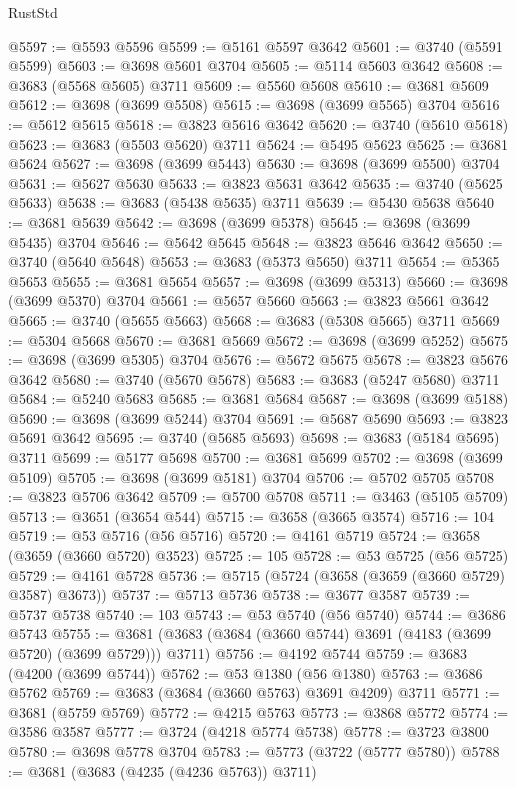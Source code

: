 \begin{lexlean}{RustStd}
\begin{coremodule}
@5597 := @5593 @5596
@5599 := @5161 @5597 @3642
@5601 := @3740 (@5591 @5599)
@5603 := @3698 @5601 @3704
@5605 := @5114 @5603 @3642
@5608 := @3683 (@5568 @5605) @3711
@5609 := @5560 @5608
@5610 := @3681 @5609
@5612 := @3698 (@3699 @5508)
@5615 := @3698 (@3699 @5565) @3704
@5616 := @5612 @5615
@5618 := @3823 @5616 @3642
@5620 := @3740 (@5610 @5618)
@5623 := @3683 (@5503 @5620) @3711
@5624 := @5495 @5623
@5625 := @3681 @5624
@5627 := @3698 (@3699 @5443)
@5630 := @3698 (@3699 @5500) @3704
@5631 := @5627 @5630
@5633 := @3823 @5631 @3642
@5635 := @3740 (@5625 @5633)
@5638 := @3683 (@5438 @5635) @3711
@5639 := @5430 @5638
@5640 := @3681 @5639
@5642 := @3698 (@3699 @5378)
@5645 := @3698 (@3699 @5435) @3704
@5646 := @5642 @5645
@5648 := @3823 @5646 @3642
@5650 := @3740 (@5640 @5648)
@5653 := @3683 (@5373 @5650) @3711
@5654 := @5365 @5653
@5655 := @3681 @5654
@5657 := @3698 (@3699 @5313)
@5660 := @3698 (@3699 @5370) @3704
@5661 := @5657 @5660
@5663 := @3823 @5661 @3642
@5665 := @3740 (@5655 @5663)
@5668 := @3683 (@5308 @5665) @3711
@5669 := @5304 @5668
@5670 := @3681 @5669
@5672 := @3698 (@3699 @5252)
@5675 := @3698 (@3699 @5305) @3704
@5676 := @5672 @5675
@5678 := @3823 @5676 @3642
@5680 := @3740 (@5670 @5678)
@5683 := @3683 (@5247 @5680) @3711
@5684 := @5240 @5683
@5685 := @3681 @5684
@5687 := @3698 (@3699 @5188)
@5690 := @3698 (@3699 @5244) @3704
@5691 := @5687 @5690
@5693 := @3823 @5691 @3642
@5695 := @3740 (@5685 @5693)
@5698 := @3683 (@5184 @5695) @3711
@5699 := @5177 @5698
@5700 := @3681 @5699
@5702 := @3698 (@3699 @5109)
@5705 := @3698 (@3699 @5181) @3704
@5706 := @5702 @5705
@5708 := @3823 @5706 @3642
@5709 := @5700 @5708
@5711 := @3463 (@5105 @5709)
@5713 := @3651 (@3654 @544)
@5715 := @3658 (@3665 @3574)
@5716 := 104
@5719 := @53 @5716 (@56 @5716)
@5720 := @4161 @5719
@5724 := @3658 (@3659 (@3660 @5720) @3523)
@5725 := 105
@5728 := @53 @5725 (@56 @5725)
@5729 := @4161 @5728
@5736 := @5715 (@5724 (@3658 (@3659 (@3660 @5729) @3587) @3673))
@5737 := @5713 @5736
@5738 := @3677 @3587
@5739 := @5737 @5738
@5740 := 103
@5743 := @53 @5740 (@56 @5740)
@5744 := @3686 @5743
@5755 := @3681 (@3683 (@3684 (@3660 @5744) @3691 (@4183 (@3699 @5720) (@3699 @5729))) @3711)
@5756 := @4192 @5744
@5759 := @3683 (@4200 (@3699 @5744))
@5762 := @53 @1380 (@56 @1380)
@5763 := @3686 @5762
@5769 := @3683 (@3684 (@3660 @5763) @3691 @4209) @3711
@5771 := @3681 (@5759 @5769)
@5772 := @4215 @5763
@5773 := @3868 @5772
@5774 := @3586 @3587
@5777 := @3724 (@4218 @5774 @5738)
@5778 := @3723 @3800
@5780 := @3698 @5778 @3704
@5783 := @5773 (@3722 (@5777 @5780))
@5788 := @3681 (@3683 (@4235 (@4236 @5763)) @3711)

\end{coremodule}
\end{lexlean}
